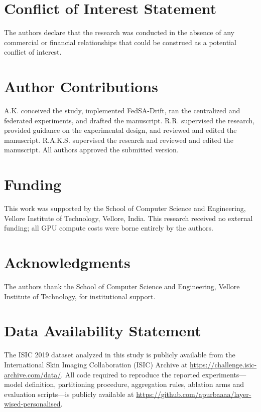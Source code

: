 \documentclass[utf8]{FrontiersinHarvard} %
\newcommand{\sadrift}{FedSA-Drift}
\begin{document}
\section*{Conflict of Interest Statement}
The authors declare that the research was conducted in the absence of any commercial or financial relationships that could be construed as a potential conflict of interest.

\section*{Author Contributions}
A.K. conceived the study, implemented \sadrift{}, ran the centralized and federated experiments, and drafted the manuscript. R.R. supervised the research, provided guidance on the experimental design, and reviewed and edited the manuscript. R.A.K.S. supervised the research and reviewed and edited the manuscript. All authors approved the submitted version.

\section*{Funding}
This work was supported by the School of Computer Science and Engineering, Vellore Institute of Technology, Vellore, India. This research received no external funding; all GPU compute costs were borne entirely by the authors.

\section*{Acknowledgments}
The authors thank the School of Computer Science and Engineering, Vellore Institute of Technology, for institutional support.

\section*{Data Availability Statement}
The ISIC 2019 dataset analyzed in this study is publicly available from the International Skin Imaging Collaboration (ISIC) Archive at \url{https://challenge.isic-archive.com/data/}. All code required to reproduce the reported experiments---model definition, partitioning procedure, aggregation rules, ablation arms and evaluation scripts---is publicly available at \url{https://github.com/apurbaaaa/layer-wised-personalised}.



\end{document}
